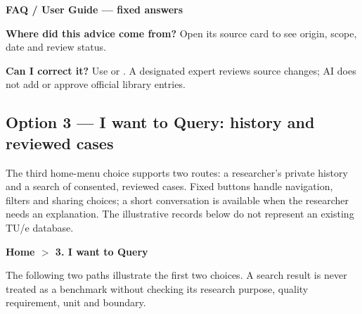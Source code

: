 \documentclass[11pt,a4paper]{article}
\begin{document}
\begin{learnscreen}
\textbf{FAQ / User Guide --- fixed answers}\par
\textbf{Where did this advice come from?} Open its source card to see origin, scope, date and review status.\par
\textbf{Can I correct it?} Use  or . A designated expert reviews source changes; AI does not add or approve official library entries.\par
{}\quad
{}\quad
{}
\end{learnscreen}



\subsection{Option 3 --- I want to Query: history and reviewed cases}
\label{sec:query-dialogue}
The third home-menu choice supports two routes: a researcher's private history and a search of consented, reviewed cases. Fixed buttons handle navigation, filters and sharing choices; a short conversation is available when the researcher needs an explanation. The illustrative records below do not represent an existing TU/e database.


\begin{queryscreen}
\textbf{Home $>$ 3. I want to Query}\par\medskip
{}\quad
{}\quad
{}\quad
{}\par\medskip
The following two paths illustrate the first two choices. A search result is never treated as a benchmark without checking its research purpose, quality requirement, unit and boundary.
\end{queryscreen}
\end{document}
